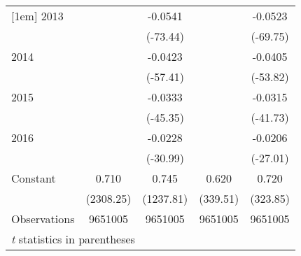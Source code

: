 \begin{table}[htbp]
\begin{tabular}{l*{4}{c}}
[1em]
2013                &            &     -0.0541&            &     -0.0523\\
                    &            &    (-73.44)&            &    (-69.75)\\
[1em]
2014                &            &     -0.0423&            &     -0.0405\\
                    &            &    (-57.41)&            &    (-53.82)\\
[1em]
2015                &            &     -0.0333&            &     -0.0315\\
                    &            &    (-45.35)&            &    (-41.73)\\
[1em]
2016                &            &     -0.0228&            &     -0.0206\\
                    &            &    (-30.99)&            &    (-27.01)\\
[1em]
Constant            &       0.710&       0.745&       0.620&       0.720\\
                    &   (2308.25)&   (1237.81)&    (339.51)&    (323.85)\\
\hline
Observations        &     9651005&     9651005&     9651005&     9651005\\
\hline\hline
\multicolumn{5}{l}{\footnotesize \textit{t} statistics in parentheses}\\
\end{tabular}
\end{table}
